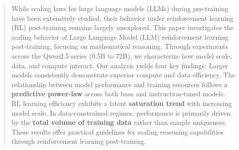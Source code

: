 \begin{abstract}
While scaling laws for large language models (LLMs) during pre-training have been extensively studied, their behavior under reinforcement learning (RL) post-training remains largely unexplored. This paper investigates the scaling behavior of Large Language Model (LLM) reinforcement learning post-training, focusing on mathematical reasoning. Through experiments across the Qwen2.5 series (0.5B to 72B), we characterize how model scale, data, and compute interact. Our analysis yields four key findings:  Larger models consistently demonstrate superior compute and data efficiency.  The relationship between model performance and training resources follows a \textbf{predictive power-law} across both base and instruction-tuned models.  RL learning efficiency exhibits a latent \textbf{saturation trend} with increasing model scale.
 In data-constrained regimes, performance is primarily driven by the \textbf{total volume of training data} rather than sample uniqueness. These results offer practical guidelines for scaling reasoning capabilities through reinforcement learning post-training.
\end{abstract}